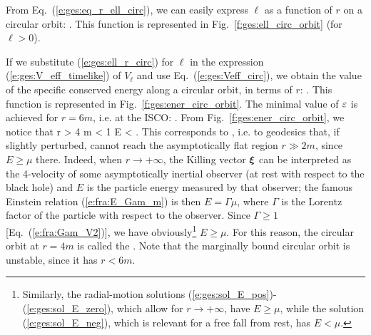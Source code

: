 From Eq.~(\ref{e:ges:eq_r_ell_circ}), we can easily express $\ell$
as a function of $r$ on a circular orbit:
\be \label{e:ges:ell_r_circ}
     .
\ee
This function is represented in Fig.~\ref{f:ges:ell_circ_orbit} (for $\ell > 0$).

If we substitute (\ref{e:ges:ell_r_circ}) for $\ell$ in
the expression (\ref{e:ges:V_eff_timelike}) of $V_{\ell}$
and use Eq.~(\ref{e:ges:Veff_circ}), we obtain the value of the
specific conserved energy along a circular orbit, in terms of $r$:
\be \label{e:ges:eps_r_circ}
     .
\ee
This function is represented in Fig.~\ref{f:ges:ener_circ_orbit}.
The minimal value of $\varepsilon$ is achieved for $r=6m$, i.e. at the ISCO:
\be \label{e:ges:veps_ISCO}
     .
\ee
From Fig.~\ref{f:ges:ener_circ_orbit}, we notice that
\be \label{e:ges:r_marginally_bound}
    r > 4 m \iff \veps < 1 \iff E < \mu .
\ee
This corresponds to ,
i.e. to geodesics that, if slightly perturbed, cannot reach the asymptotically
flat region $r\gg 2m$, since $E \geq \mu$ there. Indeed, when
$r\to +\infty$, the Killing vector $\bm{\xi}$ can be interpreted
as the 4-velocity of some asymptotically inertial observer (at rest with
respect to the black hole) and $E$ is the particle energy measured by
that observer; the famous Einstein relation (\ref{e:fra:E_Gam_m}) is then
$E = \Gamma \mu$, where $\Gamma$ is the Lorentz factor
of the particle with respect to the observer.
Since $\Gamma \geq 1$ [Eq.~(\ref{e:fra:Gam_V2})], we have obviously\footnote{Similarly,
the radial-motion solutions (\ref{e:ges:sol_E_pos})-(\ref{e:ges:sol_E_zero}), which
allow for $r\to +\infty$, have $E \geq\mu$, while the solution (\ref{e:ges:sol_E_neg}),
which is relevant for a free fall from rest, has $E < \mu$.} $E \geq \mu$.
For this reason, the circular orbit at $r=4m$ is called the
. Note that the marginally bound
circular orbit is unstable, since it has $r<6m$.

